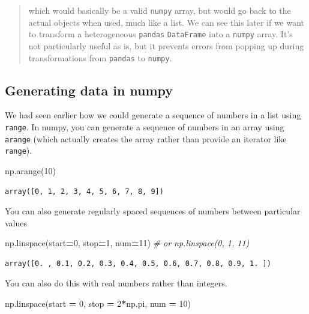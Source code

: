 \documentclass[
  letterpaper,
]{scrbook}
\newenvironment{Shaded}{\begin{snugshade}}{\end{snugshade}}
\newcommand{\CommentTok}[1]{\textcolor[rgb]{0.56,0.35,0.01}{\textit{#1}}}
\newcommand{\DecValTok}[1]{\textcolor[rgb]{0.00,0.00,0.81}{#1}}
\newcommand{\NormalTok}[1]{#1}
\newcommand{\OperatorTok}[1]{\textcolor[rgb]{0.81,0.36,0.00}{\textbf{#1}}}
\begin{document}
\begin{quote}
which would basically be a valid \texttt{numpy} array, but would go back to the actual objects when used, much like a list. We can see this later if we want to transform a heterogeneous \texttt{pandas} \texttt{DataFrame} into a \texttt{numpy} array. It's not particularly useful as is, but it prevents errors from popping up during transformations from \texttt{pandas} to \texttt{numpy}.
\end{quote}

\hypertarget{generating-data-in-numpy}{%
\subsection{Generating data in numpy}\label{generating-data-in-numpy}}

We had seen earlier how we could generate a sequence of numbers in a list using \texttt{range}. In numpy, you can generate a sequence of numbers in an array using \texttt{arange} (which actually creates the array rather than provide an iterator like \texttt{range}).

\begin{Shaded}
\begin{Highlighting}[]
\NormalTok{np.arange(}\DecValTok{10}\NormalTok{)}
\end{Highlighting}
\end{Shaded}

\begin{verbatim}
array([0, 1, 2, 3, 4, 5, 6, 7, 8, 9])
\end{verbatim}

You can also generate regularly spaced sequences of numbers between particular values

\begin{Shaded}
\begin{Highlighting}[]
\NormalTok{np.linspace(start}\OperatorTok{=}\DecValTok{0}\NormalTok{, stop}\OperatorTok{=}\DecValTok{1}\NormalTok{, num}\OperatorTok{=}\DecValTok{11}\NormalTok{) }\CommentTok{# or np.linspace(0, 1, 11)}
\end{Highlighting}
\end{Shaded}

\begin{verbatim}
array([0. , 0.1, 0.2, 0.3, 0.4, 0.5, 0.6, 0.7, 0.8, 0.9, 1. ])
\end{verbatim}

You can also do this with real numbers rather than integers.

\begin{Shaded}
\begin{Highlighting}[]
\NormalTok{np.linspace(start }\OperatorTok{=} \DecValTok{0}\NormalTok{, stop }\OperatorTok{=} \DecValTok{2}\OperatorTok{*}\NormalTok{np.pi, num }\OperatorTok{=} \DecValTok{10}\NormalTok{)}
\end{Highlighting}
\end{Shaded}
\end{document}
